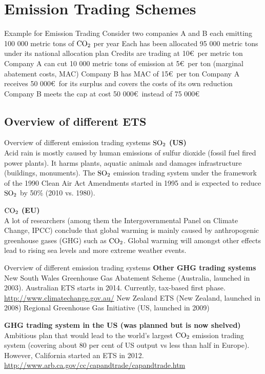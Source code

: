 \section{Emission Trading Schemes}

Example for Emission Trading
	Consider two companies A and B each emitting 100 000 metric tons of $\textnormal{CO}_2$ per year
	Each has been allocated 95 000 metric tons under its national allocation plan
	Credits are trading at 10\euro\ per metric ton
	Company A can cut 10 000 metric tons of emission at 5\euro\ per ton (marginal abatement costs, MAC)
	Company B has MAC of 15\euro\ per ton
	Company A receives 50 000\euro\ for its surplus and covers the costs of its own reduction
	Company B meets the cap at cost 50 000\euro\ instead of 75 000\euro


\subsection[Overview]{Overview of different ETS}

Overview of different emission trading systems
	\textbf{$\textnormal{SO}_2$ (US)} \\
	Acid rain is mostly caused by human emissions of sulfur dioxide (fossil fuel fired power plants). It harms plants,
	aquatic animals and damages infrastructure (buildings, monuments). The $\textnormal{SO}_2$ emission trading system 
	under the framework of the 1990 Clean Air Act Amendments started in 1995 and is expected to reduce 
	$\textnormal{SO}_2$ by 50\% (2010 vs. 1980).

	\textbf{$\textnormal{CO}_2$ (EU)} \\
	A lot of researchers (among them the Intergovernmental Panel on Climate Change, IPCC) conclude that global warming
	is mainly caused by anthropogenic greenhouse gases (GHG) such as $\textnormal{CO}_2$. Global warming will amongst 
	other effects lead to rising sea levels and  more extreme weather events.
  
  
Overview of different emission trading systems
  \textbf{Other GHG trading systems}
		New South Wales Greenhouse Gas Abatement Scheme (Australia, launched in 2003).
    Australian ETS starts in 2014. Currently, tax-based first phase. \url{http://www.climatechange.gov.au/}
    New Zealand ETS (New Zealand, launched in 2008)
    Regional Greenhouse Gas Initiative (US, launched in 2009)
        
  \textbf{GHG trading system in the US (was planned but is now shelved)} \\
		Ambitious plan that would lead to the world's largest $\textnormal{CO}_2$ emission trading system (covering about 80 per cent of US output vs less than half in Europe). However,
		California started an ETS in 2012. \url{http://www.arb.ca.gov/cc/capandtrade/capandtrade.htm}
   
